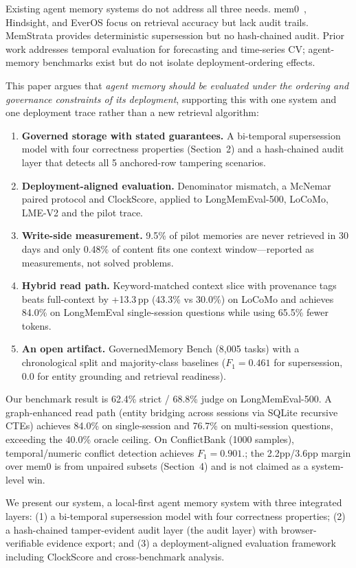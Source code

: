\documentclass{llncs}
\begin{document}
Existing agent memory systems do not address all three needs. mem0~\cite{mem0}, Hindsight, and EverOS focus on retrieval accuracy but lack audit trails. MemStrata provides deterministic supersession but no hash-chained audit. Prior work addresses temporal evaluation for forecasting and time-series CV; agent-memory benchmarks exist but do not isolate deployment-ordering effects.

This paper argues that \emph{agent memory should be evaluated under the ordering and governance constraints of its deployment}, supporting this with one system and one deployment trace rather than a new retrieval algorithm: \begin{enumerate} \item \textbf{Governed storage with stated guarantees.} A bi-temporal supersession model with four correctness properties (Section~2) and a hash-chained audit layer that detects all 5 anchored-row tampering scenarios. \item \textbf{Deployment-aligned evaluation.} Denominator mismatch, a McNemar paired protocol and ClockScore, applied to LongMemEval-500, LoCoMo, LME-V2 and the pilot trace. \item \textbf{Write-side measurement.} 9.5\% of pilot memories are never retrieved in 30 days and only 0.48\% of content fits one context window---reported as measurements, not solved problems. \item \textbf{Hybrid read path.} Keyword-matched context slice with provenance tags beats full-context by +13.3\,pp (43.3\% vs 30.0\%) on LoCoMo and achieves 84.0\% on LongMemEval single-session questions while using 65.5\% fewer tokens.
\item \textbf{An open artifact.} GovernedMemory Bench (8{,}005 tasks) with a chronological split and majority-class baselines ($F_1{=}0.461$ for supersession, 0.0 for entity grounding and retrieval readiness). \end{enumerate} Our benchmark result is 62.4\% strict / 68.8\% judge on LongMemEval-500. A graph-enhanced read path (entity bridging across sessions via SQLite recursive CTEs) achieves 84.0\% on single-session and 76.7\% on multi-session questions, exceeding the 40.0\% oracle ceiling. On ConflictBank (1{}000 samples), temporal/numeric conflict detection achieves $F_1{=}0.901$.; the 2.2pp/3.6pp margin over mem0 is from unpaired subsets (Section~4) and is not claimed as a system-level win.

We present our system, a local-first agent memory system with three integrated layers: (1) a bi-temporal supersession model with four correctness properties; (2) a hash-chained tamper-evident audit layer (the audit layer) with browser-verifiable evidence export; and (3) a deployment-aligned evaluation framework including ClockScore and cross-benchmark analysis.
\end{document}
